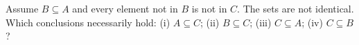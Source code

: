 Assume $ B\subseteq A $ and every element not in $ B $ is not in $ C $. The sets are not identical. Which conclusions necessarily hold: (i) $ A\subseteq C $; (ii) $ B\subseteq C $; (iii) $ C\subseteq A $; (iv) $ C\subseteq B $?
